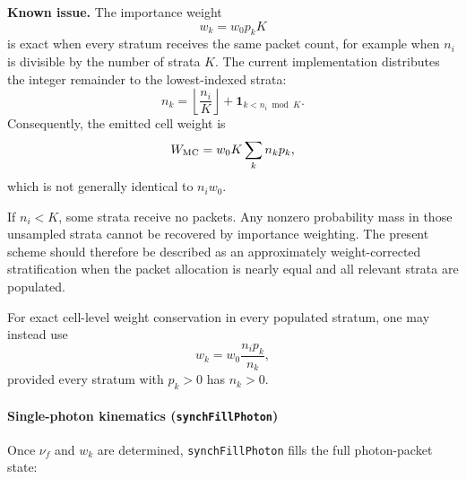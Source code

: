 \documentclass[12pt,a4paper]{article}
\newcommand{\nuf}{\nu_{\!f}}
\newcommand{\code}[1]{\texttt{#1}}
\newenvironment{knownissue}{%
	\begin{framed}\noindent\textbf{Known issue.}\quad}
	{\end{framed}}
\begin{document}
\begin{knownissue}
	The importance weight
	\begin{equation}
		w_k
		=
		w_0p_kK
	\end{equation}
	is exact when every stratum receives the same packet count, for example
	when \(n_i\) is divisible by the number of strata \(K\). The current
	implementation distributes the integer remainder to the lowest-indexed
	strata:
	\begin{equation}
		n_k
		=
		\left\lfloor\frac{n_i}{K}\right\rfloor
		+
		\mathbf{1}_{k<n_i\bmod K}.
	\end{equation}
	Consequently, the emitted cell weight is
	\begin{equation}
		W_{\rm MC}
		=
		w_0K\sum_k n_kp_k,
	\end{equation}
	which is not generally identical to \(n_iw_0\).
	
	If \(n_i<K\), some strata receive no packets. Any nonzero probability
	mass in those unsampled strata cannot be recovered by importance
	weighting. The present scheme should therefore be described as an
	approximately weight-corrected stratification when the packet allocation
	is nearly equal and all relevant strata are populated.
	
	For exact cell-level weight conservation in every populated stratum,
	one may instead use
	\begin{equation}
		w_k
		=
		w_0\frac{n_ip_k}{n_k},
	\end{equation}
	provided every stratum with \(p_k>0\) has \(n_k>0\).
\end{knownissue}

\paragraph{Single-photon kinematics (\texttt{synchFillPhoton})}
\label{sec:kinematics}

Once \(\nuf\) and \(w_k\) are determined, \code{synchFillPhoton} fills
the full photon-packet state:
\end{document}
